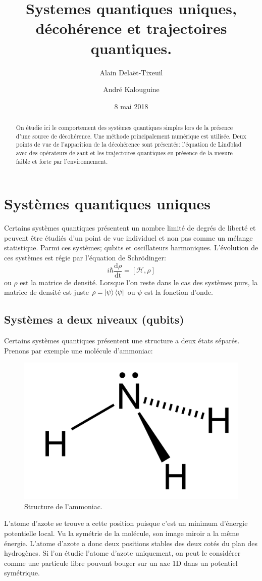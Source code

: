 \documentclass[11pt,a4paper]{article}
\author{Alain Delaët-Tixeuil \and André Kalouguine}
\title{Systemes quantiques uniques, décohérence et trajectoires quantiques.}
\date{8 mai 2018}
\newcommand{\q}{q\hspace{-0.5ex}u}
\begin{document}
	\maketitle
	\begin{abstract}
		On étudie ici le comportement des systèmes quantiques simples lors de la présence d'une source de décohérence. Une méthode principalement numérique est utilisée. Deux points de vue de l'apparition de la décohérence sont présentés: l'équation de Lindblad avec des opérateurs de saut et les trajectoires quantiques en présence de la mesure faible et forte par l'environnement.
	\end{abstract}
	\section{Systèmes quantiques uniques}
	Certains systèmes quantiques présentent un nombre limité de degrés de liberté et peuvent être étudiés d'un point de vue individuel et non pas comme un mélange statistique. Parmi ces systèmes; \q bits et oscillateurs harmoniques.
	L'évolution de ces systèmes est régie par l'équation de Schrödinger:
	\begin{equation}
			i\hbar \frac{\textrm{d}\rho}{\textrm{dt}}=\left[\mathcal{H},\rho\right]
	\end{equation}
	ou $\rho$ est la matrice de densité. Lorsque l'on reste dans le cas des systèmes purs, la matrice de densité est juste $\rho=\ket{\psi}\bra{\psi}$ ou $\psi$ est la fonction d'onde.
	\subsection{Systèmes a deux niveaux (\q bits)}
	Certains systèmes quantiques présentent une structure a deux états séparés. Prenons par exemple une molécule d'ammoniac:
	\begin{figure}[!ht]
		\centering
		\includegraphics[width=0.4\linewidth]{ammonia}
		\caption{Structure de l'ammoniac.}
		\label{fig:ammonia}
	\end{figure}
	L'atome d'azote se trouve a cette position puisque c'est un minimum d'énergie potentielle local. Vu la symétrie de la molécule, son image miroir a la même énergie. L'atome d'azote a donc deux positions stables des deux cotés du plan des hydrogènes. Si l'on étudie l'atome d'azote uniquement, on peut le considérer comme une particule libre pouvant bouger sur un axe 1D dans un potentiel symétrique.
		
\end{document}
